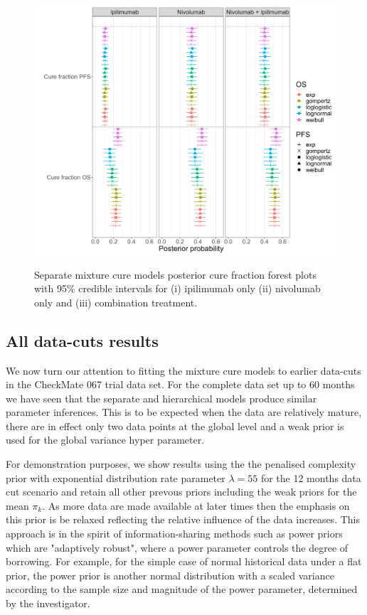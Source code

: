\documentclass[AMA,STIX1COL]{WileyNJD-v2}
\begin{document}
\begin{figure}[hbt!]
\centering
\includegraphics[height=10cm, width=0.9\linewidth]{forest_plot_sep_multimcm.png}
\caption{\label{fig:cf_forest_all_tx_sep} Separate mixture cure models posterior cure fraction forest plots with 95\% credible intervals for (i) ipilimumab only (ii) nivolumab only and (iii) combination treatment.}
\end{figure}

%
\subsection{All data-cuts results}\label{sec:results-data-cut}
We now turn our attention to fitting the mixture cure models to earlier data-cuts in the CheckMate 067 trial data set.
For the complete data set up to 60 months we have seen that the separate and hierarchical models produce similar parameter inferences. This is to be expected when the data are relatively mature, there are in effect only two data points at the global level and a weak prior is used for the global variance hyper parameter.

For demonstration purposes, we show results using the the penalised complexity prior with exponential distribution rate parameter $\lambda = 55$ for the 12 months data cut scenario and retain all other prevous priors including the weak priors for the mean $\pi_k$. As more data are made available at later times then the emphasis on this prior is be relaxed reflecting the relative influence of the data increases. This approach is in the spirit of information-sharing methods such as power priors which are "adaptively robust", where a power parameter controls the degree of borrowing. For example, for the simple case of normal historical data under a flat prior, the power prior is another normal distribution with a scaled variance according to the sample size and magnitude of the power parameter, determined by the investigator.
\end{document}
